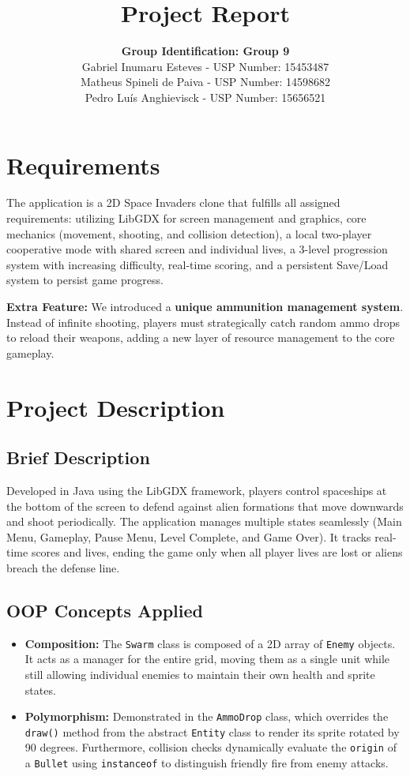 \documentclass[12pt, a4paper]{article}
\title{\vspace{-2cm}\textbf{Project Report}\vspace{-0.5cm}}
\author{
    \textbf{Group Identification: Group 9} \\[0.3cm]
    Gabriel Inumaru Esteves - USP Number: 15453487 \\
    Matheus Spineli de Paiva - USP Number: 14598682 \\
    Pedro Luís Anghievisck - USP Number: 15656521
}
\date{}
\begin{document}
\maketitle

\section{Requirements}
The application is a 2D Space Invaders clone that fulfills all assigned requirements: utilizing LibGDX for screen management and graphics, core mechanics (movement, shooting, and collision detection), a local two-player cooperative mode with shared screen and individual lives, a 3-level progression system with increasing difficulty, real-time scoring, and a persistent Save/Load system to persist game progress. 

\textbf{Extra Feature:} We introduced a \textbf{unique ammunition management system}. Instead of infinite shooting, players must strategically catch random ammo drops to reload their weapons, adding a new layer of resource management to the core gameplay.

\section{Project Description}

\subsection{Brief Description}
Developed in Java using the LibGDX framework, players control spaceships at the bottom of the screen to defend against alien formations that move downwards and shoot periodically. The application manages multiple states seamlessly (Main Menu, Gameplay, Pause Menu, Level Complete, and Game Over). It tracks real-time scores and lives, ending the game only when all player lives are lost or aliens breach the defense line. 

\subsection{OOP Concepts Applied}
\begin{itemize}
    \item \textbf{Composition:} The \texttt{Swarm} class is composed of a 2D array of \texttt{Enemy} objects. It acts as a manager for the entire grid, moving them as a single unit while still allowing individual enemies to maintain their own health and sprite states.
    \item \textbf{Polymorphism:} Demonstrated in the \texttt{AmmoDrop} class, which overrides the \texttt{draw()} method from the abstract \texttt{Entity} class to render its sprite rotated by 90 degrees. Furthermore, collision checks dynamically evaluate the \texttt{origin} of a \texttt{Bullet} using \texttt{instanceof} to distinguish friendly fire from enemy attacks.
\end{itemize}
\end{document}
